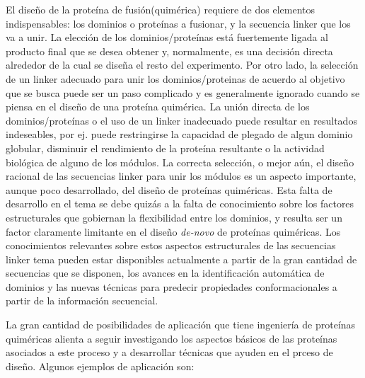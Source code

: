 El diseño de la proteína de fusión(quimérica) requiere de dos elementos indispensables:
los dominios o proteínas a fusionar, y la secuencia linker que los va a unir.
La elección de los dominios/proteínas está fuertemente ligada al producto final que se desea obtener y, normalmente, es una decisión directa alrededor de la cual se diseña el resto del experimento.
Por otro lado, la selección de un linker adecuado para unir los dominios/proteinas de acuerdo al objetivo que se busca puede ser un paso complicado y es generalmente ignorado cuando se piensa en el diseño de una proteína quimérica.
La unión directa de los dominios/proteínas o el uso de un linker inadecuado puede resultar en resultados indeseables, por ej. puede restringirse la capacidad de plegado de algun dominio globular, 
disminuir el rendimiento de la proteína resultante o la actividad biológica de alguno de los módulos.
La correcta selección, o mejor aún, el diseño racional de las secuencias linker para unir los módulos es un aspecto importante, aunque poco desarrollado, del diseño de proteínas quiméricas. 
Esta falta de desarrollo en el tema se debe quizás a la falta de conocimiento sobre los factores estructurales que gobiernan la flexibilidad entre los dominios, y resulta ser un factor claramente 
limitante en el diseño \textit{de-novo} de proteínas quiméricas. 
Los conocimientos relevantes sobre estos aspectos estructurales de las secuencias linker tema pueden estar disponibles actualmente a partir de la gran cantidad de secuencias que se disponen, los avances en 
la identificación automática de dominios y las nuevas técnicas para predecir propiedades conformacionales a partir de la información secuencial.






%



La gran cantidad de posibilidades de aplicación que tiene ingeniería de proteínas quiméricas alienta a seguir investigando 
los aspectos básicos de las proteínas asociados a este proceso y a desarrollar técnicas que ayuden en el prceso de diseño.
Algunos ejemplos de aplicación son: 

